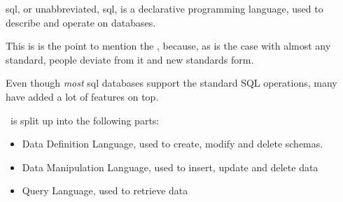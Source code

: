 \acrshort{sql}, or unabbreviated, \acrlong{sql}, is a \gls{declarative} programming language, used to describe and operate on databases.

This is is the point to mention the , because, as is the case with almost any standard,
people deviate from it and new standards form.

Even though \textit{most} \acrshort{sql} databases support the standard SQL operations, many have added a lot of features on top.

\sql\ is split up into the following parts:
\begin{itemize}
    \item Data Definition Language, used to create, modify and delete schemas.
    \item Data Manipulation Language, used to insert, update and delete data
    \item Query Language, used to retrieve data
\end{itemize}
